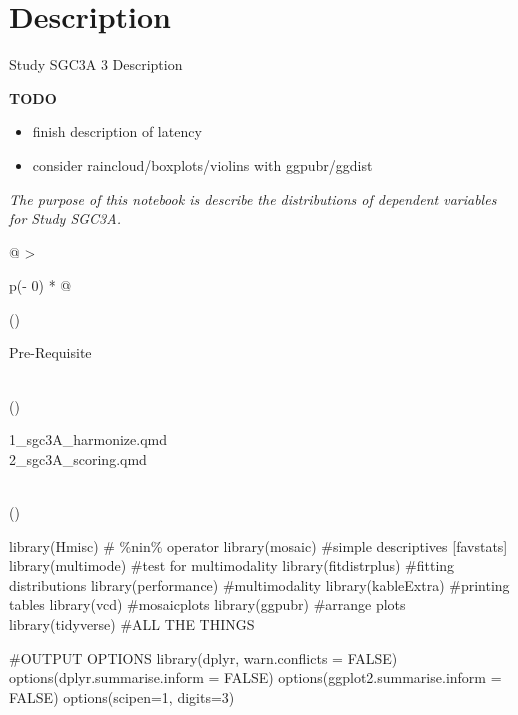\documentclass[
  letterpaper,
  DIV=11,
  numbers=noendperiod]{scrreprt}
\newenvironment{Shaded}{\begin{snugshade}}{\end{snugshade}}
\newcommand{\AttributeTok}[1]{\textcolor[rgb]{0.40,0.45,0.13}{#1}}
\newcommand{\CommentTok}[1]{\textcolor[rgb]{0.37,0.37,0.37}{#1}}
\newcommand{\ConstantTok}[1]{\textcolor[rgb]{0.56,0.35,0.01}{#1}}
\newcommand{\DecValTok}[1]{\textcolor[rgb]{0.68,0.00,0.00}{#1}}
\newcommand{\FunctionTok}[1]{\textcolor[rgb]{0.28,0.35,0.67}{#1}}
\newcommand{\NormalTok}[1]{\textcolor[rgb]{0.00,0.23,0.31}{#1}}
\providecommand{\tightlist}{%
  \setlength{\itemsep}{0pt}\setlength{\parskip}{0pt}}\usepackage{longtable,booktabs,array}
\begin{document}
\hypertarget{sec-SGC3A-description}{%
\chapter{Description}\label{sec-SGC3A-description}}

Study SGC3A \textbar{} 3 Description

\hfill\break

\newpage

\textbf{TODO}

\begin{itemize}
\tightlist
\item
  finish description of latency
\item
  consider raincloud/boxplots/violins with ggpubr/ggdist
\end{itemize}

\emph{The purpose of this notebook is describe the distributions of
dependent variables for Study SGC3A.}

\begin{longtable}[]{@{}
  >{\raggedright\arraybackslash}p{(\columnwidth - 0\tabcolsep) * }@{}}
\toprule()
\begin{minipage}[b]{\linewidth}\raggedright
Pre-Requisite
\end{minipage} \\
\midrule()
\endhead
\begin{minipage}[t]{\linewidth}\raggedright
1\_sgc3A\_harmonize.qmd\\
2\_sgc3A\_scoring.qmd\strut
\end{minipage} \\
\bottomrule()
\end{longtable}

\begin{Shaded}
\begin{Highlighting}[]
\FunctionTok{library}\NormalTok{(Hmisc) }\CommentTok{\# \%nin\% operator}
\FunctionTok{library}\NormalTok{(mosaic) }\CommentTok{\#simple descriptives [favstats]}
\FunctionTok{library}\NormalTok{(multimode) }\CommentTok{\#test for multimodality}
\FunctionTok{library}\NormalTok{(fitdistrplus) }\CommentTok{\#fitting distributions}
\FunctionTok{library}\NormalTok{(performance) }\CommentTok{\#multimodality}
\FunctionTok{library}\NormalTok{(kableExtra) }\CommentTok{\#printing tables }
\FunctionTok{library}\NormalTok{(vcd) }\CommentTok{\#mosaicplots}
\FunctionTok{library}\NormalTok{(ggpubr) }\CommentTok{\#arrange plots}
\FunctionTok{library}\NormalTok{(tidyverse) }\CommentTok{\#ALL THE THINGS}

\CommentTok{\#OUTPUT OPTIONS}
\FunctionTok{library}\NormalTok{(dplyr, }\AttributeTok{warn.conflicts =} \ConstantTok{FALSE}\NormalTok{)}
\FunctionTok{options}\NormalTok{(}\AttributeTok{dplyr.summarise.inform =} \ConstantTok{FALSE}\NormalTok{)}
\FunctionTok{options}\NormalTok{(}\AttributeTok{ggplot2.summarise.inform =} \ConstantTok{FALSE}\NormalTok{)}
\FunctionTok{options}\NormalTok{(}\AttributeTok{scipen=}\DecValTok{1}\NormalTok{, }\AttributeTok{digits=}\DecValTok{3}\NormalTok{)}
\end{Highlighting}
\end{Shaded}
\end{document}
